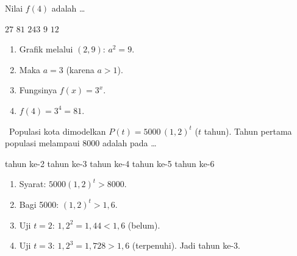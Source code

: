 \documentclass[11pt,a4paper]{exam}
\newenvironment{langkah}{%
  \begin{enumerate}[label=\textbf{Langkah \arabic*:},leftmargin=2.6em,
    itemsep=2pt,topsep=2pt]}{\end{enumerate}}
\newcommand{\Adv}{{\footnotesize\textsf{\textcolor{oranye}{[Advanced]}}}\ }
\begin{document}
\begin{questions}
\begin{center}
\end{center}

Nilai $f(4)$ adalah \dots
\begin{choices}
\choice $27$ \CorrectChoice $81$ \choice $243$ \choice $9$ \choice $12$
\end{choices}
\begin{solution}
\begin{langkah}
\item Grafik melalui $(2,9)$: $a^{2}=9$.
\item Maka $a = 3$ (karena $a>1$).
\item Fungsinya $f(x) = 3^{x}$.
\item $f(4) = 3^{4} = 81$.
\end{langkah}
\end{solution}

\question \Adv Populasi kota dimodelkan $P(t) = 5000\,(1{,}2)^{t}$ ($t$ tahun).
Tahun pertama populasi melampaui 8000 adalah pada \dots
\begin{choices}
\choice tahun ke-2 \CorrectChoice tahun ke-3 \choice tahun ke-4
\choice tahun ke-5 \choice tahun ke-6
\end{choices}
\begin{solution}
\begin{langkah}
\item Syarat: $5000(1{,}2)^{t} > 8000$.
\item Bagi 5000: $(1{,}2)^{t} > 1{,}6$.
\item Uji $t=2$: $1{,}2^{2}=1{,}44 < 1{,}6$ (belum).
\item Uji $t=3$: $1{,}2^{3}=1{,}728 > 1{,}6$ (terpenuhi). Jadi tahun ke-3.
\end{langkah}
\end{solution}


\end{questions}
\end{document}
